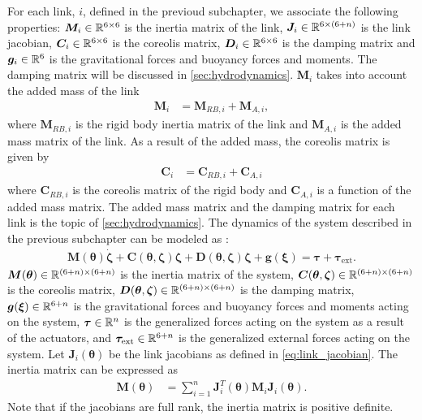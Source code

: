 For each link, $i$, defined in the previoud subchapter, we associate the following
properties: $\bm{M}_i \in \mathbb{R}^{6 \times 6}$ is the inertia matrix of the link,
$\bm{J}_i \in \mathbb{R}^{6 \times (6+n)}$ is the link jacobian, $\bm{C}_i \in \mathbb{R}^{6 \times 6}$
is the coreolis matrix, $\bm{D}_i \in \mathbb{R}^{6 \times 6}$ is the damping matrix and
$\bm{g}_i \in \mathbb{R}^{6}$ is the gravitational forces and buoyancy forces and moments.
The damping matrix will be discussed in \autoref{sec:hydrodynamics}.
$\bm{M}_i$ takes into account the added mass of the link
\begin{align}
    \bm{M}_i &= \bm{M}_{RB,i} + \bm{M}_{A,i},
\end{align}
where $\bm{M}_{RB,i}$ is the rigid body inertia matrix of the link and $\bm{M}_{A,i}$
is the added mass matrix of the link. As a result of the added mass, the coreolis
matrix is given by
\begin{align}
    \bm{C}_i &= \bm{C}_{RB,i} + \bm{C}_{A,i}
\end{align}
where $\bm{C}_{RB,i}$ is the coreolis matrix of the rigid body and $\bm{C}_{A,i}$
is a function of the added mass matrix. The added mass matrix and the damping matrix
for each link is the topic of \autoref{sec:hydrodynamics}. The dynamics of the
system described in the previous subchapter can be modeled as
\cite{from2014}:
\begin{align}
    \bm{M}(\bm{\theta})\dot{\bm{\zeta}} +
        \bm{C}(\bm{\theta}, \bm{\zeta}) \bm{\zeta} +
        \bm{D}(\bm{\theta}, \bm{\zeta}) \bm{\zeta} +
        \bm{g}(\bm{\xi}) =
        \bm{\tau} + \bm{\tau}_{\mathrm{ext}}.
\end{align}
$\bm{M}(\bm{\theta}) \in \mathbb{R}^{(6+n)\times(6+n)}$  is the inertia matrix of the
system, $\bm{C}(\bm{\theta}, \bm{\zeta}) \in \mathbb{R}^{(6+n)\times(6+n)}$ is the
coreolis matrix, $\bm{D}(\bm{\theta}, \bm{\zeta}) \in \mathbb{R}^{(6+n)\times(6+n)}$ is
the damping matrix, $\bm{g}(\bm{\xi}) \in \mathbb{R}^{6+n}$ is the gravitational forces
and buoyancy forces and moments acting on the system, $\bm{\tau} \in \mathbb{R}^{n}$ is the generalized
forces acting on the system as a result of the actuators,
and $\bm{\tau}_{\mathrm{ext}} \in \mathbb{R}^{6+n}$ is the
generalized external forces acting on the system. Let $\bm{J}_{i}(\bm{\theta})$
be the link jacobians as defined in \autoref{eq:link_jacobian}.
The inertia matrix
can be expressed as
\begin{align}
    \bm{M}(\bm{\theta}) &= \sum_{i=1}^{n} \bm{J}_{i}^T(\bm{\theta}) \bm{M}_i \bm{J}_{i}(\bm{\theta}).
\end{align}
Note that if the jacobians are full rank, the inertia matrix is positive definite.
